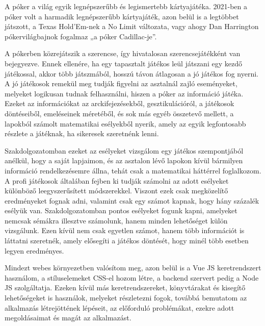 
A póker a világ egyik legnépszerűbb és legismertebb kártyajátéka. 2021-ben a póker volt a harmadik legnépszerűbb kártyajáték, azon belül is a legtöbbet játszott, a Texas Hold’Em-nek a No Limit változata, vagy ahogy Dan Harrington pókervilágbajnok fogalmaz „a póker Cadillac-je”\cite{harrington}. 

A pókerben közrejátszik a szerencse, így hivatalosan szerencsejátékként van bejegyezve. Ennek ellenére, ha egy tapasztalt játékos leül játszani egy kezdő játékossal, akkor több játszmából, hosszú távon átlagosan a jó játékos fog nyerni. A jó játékosok remekül meg tudják figyelni az asztalnál zajló eseményeket, melyeket logikusan tudnak felhasználni, hiszen a póker az információ játéka. Ezeket az információkat az arckifejezésekből, gesztikulációról, a játékosok döntéseiből, emeléseinek méretéből, és sok más egyéb összetevő mellett, a lapokból számolt matematikai esélyekből nyerik, amely az egyik legfontosabb részlete a játéknak, ha sikeresek szeretnénk lenni.

Szakdolgozatomban ezeket az esélyeket vizsgálom egy játékos szempontjából anélkül, hogy a saját lapjaimon, és az asztalon lévő lapokon kívül bármilyen információ rendelkezésemre állna, tehát csak a matematikai háttérrel foglalkozom. A profi játékosok általában fejben ki tudják számolni az adott esélyeket különböző leegyszerűsített módszerekkel. Viszont ezek csak megközelítő eredményeket fognak adni, valamint csak egy számot kapnak, hogy hány százalék esélyük van. Szakdolgozatomban pontos esélyeket fogunk kapni, amelyeket nemcsak sémákra illesztve számolunk, hanem minden lehetőséget külön vizsgálunk. Ezen kívül nem csak egyetlen számot, hanem több információt is láttatni szeretnék, amely elősegíti a játékos döntését, hogy minél több esetben legyen eredményes.

Mindezt webes környezetben valósítom meg, azon belül is a Vue JS keretrendszert használom, a stíluselemeket CSS-el hozom létre, a backend szervert pedig a Node JS szolgáltatja. Ezeken kívül más keretrendszereket, könyvtárakat és kisegítő lehetőségeket is használok, melyeket részletezni fogok, továbbá bemutatom az alkalmazás létrejöttének lépéseit, az előforduló problémákat, ezekre adott megoldásaimat és magát az alkalmazást.